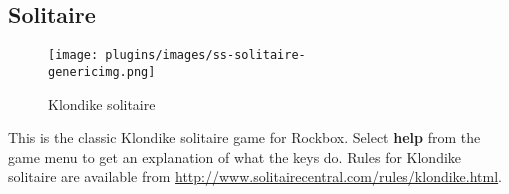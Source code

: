 \subsection{Solitaire}
\begin{figure}[h!]
\begin{center}
\texttt{[image: plugins/images/ss-solitaire-\\genericimg.png]}
\end{center}
\caption{Klondike solitaire}
\end{figure}

This is the classic Klondike solitaire game
for Rockbox.  Select \textbf{help }from the game menu to get an
explanation of what the keys do.  Rules for Klondike solitaire are
available from \url{http://www.solitairecentral.com/rules/klondike.html}.


